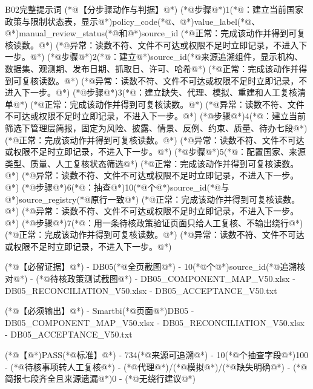 \documentclass[UTF8,openany,zihao=-4]{ctexbook}
\renewcommand{\_}{\textunderscore\allowbreak}
\begin{document}
\begin{PromptBox}{B02完整提示词}
(*@{\promptcjk 【分步骤动作与判据】}@*)
(*@{\promptcjk 步骤}@*)1(*@{\promptcjk ：建立当前国家政策与限制状态表，显示}@*)policy_code(*@{\promptcjk 、}@*)value_label(*@{\promptcjk 、}@*)manual_review_status(*@{\promptcjk 和}@*)source_id
  (*@{\promptcjk 正常：完成该动作并得到可复核读数。}@*)
  (*@{\promptcjk 异常：读数不符、文件不可达或权限不足时立即记录，不进入下一步。}@*)
(*@{\promptcjk 步骤}@*)2(*@{\promptcjk ：建立}@*)source_id(*@{\promptcjk 来源追溯组件，显示机构、数据集、观测期、发布日期、抓取日、许可、哈希}@*)
  (*@{\promptcjk 正常：完成该动作并得到可复核读数。}@*)
  (*@{\promptcjk 异常：读数不符、文件不可达或权限不足时立即记录，不进入下一步。}@*)
(*@{\promptcjk 步骤}@*)3(*@{\promptcjk ：建立缺失、代理、模拟、重建和人工复核清单}@*)
  (*@{\promptcjk 正常：完成该动作并得到可复核读数。}@*)
  (*@{\promptcjk 异常：读数不符、文件不可达或权限不足时立即记录，不进入下一步。}@*)
(*@{\promptcjk 步骤}@*)4(*@{\promptcjk ：建立当前筛选下管理层简报，固定为风险、披露、情景、反例、约束、质量、待办七段}@*)
  (*@{\promptcjk 正常：完成该动作并得到可复核读数。}@*)
  (*@{\promptcjk 异常：读数不符、文件不可达或权限不足时立即记录，不进入下一步。}@*)
(*@{\promptcjk 步骤}@*)5(*@{\promptcjk ：配置国家、来源类型、质量、人工复核状态筛选}@*)
  (*@{\promptcjk 正常：完成该动作并得到可复核读数。}@*)
  (*@{\promptcjk 异常：读数不符、文件不可达或权限不足时立即记录，不进入下一步。}@*)
(*@{\promptcjk 步骤}@*)6(*@{\promptcjk ：抽查}@*)10(*@{\promptcjk 个}@*)source_id(*@{\promptcjk 与}@*)source_registry(*@{\promptcjk 原行一致}@*)
  (*@{\promptcjk 正常：完成该动作并得到可复核读数。}@*)
  (*@{\promptcjk 异常：读数不符、文件不可达或权限不足时立即记录，不进入下一步。}@*)
(*@{\promptcjk 步骤}@*)7(*@{\promptcjk ：用一条待核政策验证页面只给人工复核、不输出绕行}@*)
  (*@{\promptcjk 正常：完成该动作并得到可复核读数。}@*)
  (*@{\promptcjk 异常：读数不符、文件不可达或权限不足时立即记录，不进入下一步。}@*)

(*@{\promptcjk 【必留证据】}@*)
- DB05(*@{\promptcjk 全页截图}@*)
- 10(*@{\promptcjk 个}@*)source_id(*@{\promptcjk 追溯核对}@*)
- (*@{\promptcjk 待核政策测试截图}@*)
- DB05_COMPONENT_MAP_V50.xlsx
- DB05_RECONCILIATION_V50.xlsx
- DB05_ACCEPTANCE_V50.txt

(*@{\promptcjk 【必须输出】}@*)
- Smartbi(*@{\promptcjk 页面}@*)DB05
- DB05_COMPONENT_MAP_V50.xlsx
- DB05_RECONCILIATION_V50.xlsx
- DB05_ACCEPTANCE_V50.txt

(*@{\promptcjk 【}@*)PASS(*@{\promptcjk 标准】}@*)
- 734(*@{\promptcjk 来源可追溯}@*)
- 10(*@{\promptcjk 个抽查字段}@*)100%
- (*@{\promptcjk 待核事项转人工复核}@*)
- (*@{\promptcjk 代理}@*)/(*@{\promptcjk 模拟}@*)/(*@{\promptcjk 缺失明确}@*)
- (*@{\promptcjk 简报七段齐全且来源遗漏}@*)0
- (*@{\promptcjk 无绕行建议}@*)


\end{PromptBox}
\end{document}
